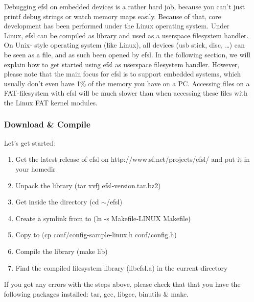 Debugging efsl on embedded devices is a rather hard job, because
you can't just printf debug strings or watch memory maps easily. 
Because of that, core development has been performed under the 
Linux operating system. Under Linux, efsl can be compiled as 
library and used as a userspace filesystem handler. On Unix-
style operating system (like Linux), all devices (usb stick, disc, \ldots)
can be seen as a file, and as such been opened by efsl.\newline
\newline
In the following section, we will explain how to get started using
efsl as userspace filesystem handler. However, please note that the main
focus for efsl is to support embedded systems, which usually don't even
have 1\% of the memory you have on a PC. Accessing files on a FAT-filesystem
with efsl will be much slower than when accessing these files with the Linux
FAT kernel modules.
\subsubsection{Download \& Compile}
Let's get started:
\begin{enumerate}
	\item{Get the latest release of efsl on http://www.sf.net/projects/efsl/ 
		and put it in your homedir}
	\item{Unpack the library (tar xvfj efsl-version.tar.bz2)}
	\item{Get inside the directory (cd $\sim$/efsl)}
	\item{Create a symlink from  to  
		(ln -s Makefile-LINUX Makefile)}
	\item{Copy  to 
		(cp conf/config-sample-linux.h conf/config.h)}
	\item{Compile the library (make lib)}
	\item{Find the compiled filesystem library (libefsl.a) in the current 
		directory}
\end{enumerate}
If you got any errors with the steps above, please check that that you have
the following packages installed: tar, gcc, libgcc, binutils \& make.
